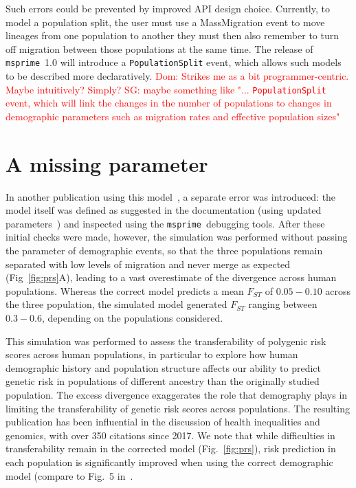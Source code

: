 \documentclass{article}
\newcommand{\msprime}[0]{\texttt{msprime}}
\newcommand{\dncomment}[1]{{\textcolor{red}{Dom: #1}}}
\newcommand{\sgcomment}[1]{{\textcolor{red}{SG: #1}}}
\begin{document}
Such errors could be prevented by improved API design choice.
Currently, to model a population split, the user must use a MassMigration event to move
lineages from one population to another they must then also remember to turn off migration
between those populations at the same time.
The release of \msprime\ 1.0 will introduce a \texttt{PopulationSplit} event, which allows
such models to be described more declaratively.
\dncomment{Strikes me as a bit programmer-centric. Maybe intuitively? Simply?}
\sgcomment{maybe something like "... \texttt{PopulationSplit}  event, which will link the changes in 
the number of populations to changes in demographic parameters such as
migration rates and effective population sizes"  }

\section{A missing parameter}

In another publication using this model~\citep{martin2017human},
a separate error was introduced: the model itself was defined as suggested
in the documentation (using updated parameters~\citep{gravel2011demographic}) and inspected using the \msprime\
debugging tools. After these initial checks were made, however, the simulation
was performed without passing the parameter of demographic events,
so that the three populations remain separated with low levels of migration and
never merge as expected (Fig~\ref{fig:prs}A),
leading to a vast overestimate of the divergence across human populations. 
Whereas the correct model predicts a mean $F_{ST}$ of
$0.05 - 0.10$ across the three population, the simulated model generated $F_{ST}$
ranging between $0.3 - 0.6$, depending on the populations considered.

This simulation was performed to assess the
transferability of polygenic risk scores across human populations, in particular to
explore how human demographic history and population structure affects our ability
to predict genetic risk in populations of different ancestry than the originally studied
population. 
The excess divergence exaggerates the role that demography plays in limiting the transferability
of genetic risk scores across populations. The resulting publication has been influential in the discussion of
health inequalities and genomics, with over 350 citations since 2017.
We note that while difficulties in transferability remain in the corrected model
(Fig.~\ref{fig:prs}), risk prediction in each population is significantly improved
when using the correct demographic model (compare to Fig.~5 in~\citet{martin2017human}.
\end{document}
